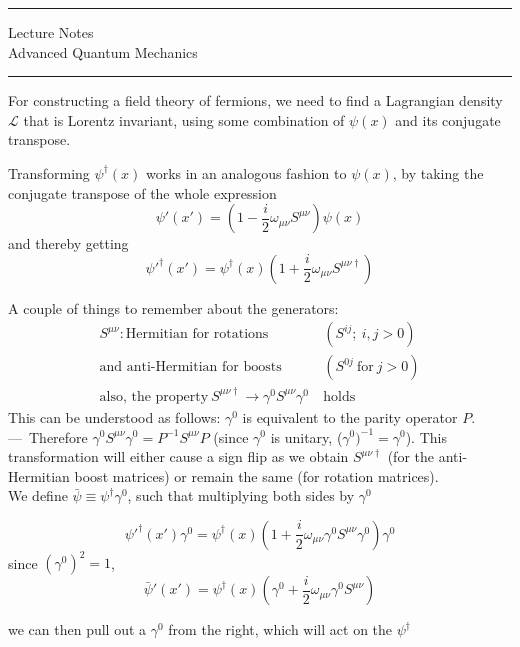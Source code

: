 \documentclass[11pt]{article}
\author{Aayush Arya}
\title{}
\date{January 23, 2023}
\newcommand{\lag}{\mathcal{L}}
\begin{document}
	\maketitle
	
	\hrule
	\begin{center}
		Lecture Notes\\
		Advanced Quantum Mechanics
	\end{center}
	\hrule 
	
	\vspace{11pt}
	For constructing a field theory of fermions, we need to find a Lagrangian density $\lag$ that is Lorentz invariant, using some combination of $\psi(x)$ and its conjugate transpose.
	
	Transforming $\psi^\dagger(x)$ works in an analogous fashion to $\psi(x)$, by taking the conjugate transpose of the whole expression \[ \psi'(x') = \left(1 - \frac{i}{2}\omega_{\mu \nu}S^{\mu\nu}\right) \psi(x)\]
	and thereby getting
	\[ \psi'^\dagger (x') = \psi^\dagger(x)\left(1 + \frac{i}{2} \omega_{\mu\nu}S^{\mu\nu \dagger} \right)\]

	A couple of things to remember about the generators:
	\begin{align*}
		S^{\mu\nu}: \text{Hermitian for rotations}&\ (S^{ij};\ i,j > 0)\\
		 \text{and anti-Hermitian for boosts}&\ (S^{0j}\  \text{for}\ j > 0)\\
		 \text{also, the property}\ S^{\mu\nu\dagger} \rightarrow \gamma^0 S^{\mu\nu} \gamma^0 &\  \text{holds}
	\end{align*}
	This can be understood as follows: $\gamma^0$ is equivalent to the parity operator $P$.\\
	 \----\ Therefore $\gamma^0 S^{\mu\nu} \gamma^0 = P^{-1} S^{\mu\nu} P$ (since $\gamma^0$ is unitary, ($\gamma^0)^{-1} = \gamma^0$). This transformation will either cause a sign flip as we obtain $S^{\mu\nu\dagger}$ (for the anti-Hermitian boost matrices) or remain the same (for rotation matrices).\\
	
	We define $\bar{\psi} \equiv \psi^\dagger \gamma^0$, such that multiplying both sides by $\gamma^0$
	
	\[\psi'^\dagger(x')\gamma^0 = \psi^\dagger(x) \left(1 + \frac{i}{2}\omega_{\mu \nu}\gamma^0 S^{\mu\nu}\gamma^0 \right) \gamma^0\]
	since $(\gamma^0)^2 = 1$,
	\[ \bar{\psi}'(x') = \psi^\dagger (x) \left( \gamma^0 + \frac{i}{2}\omega_{\mu\nu}\gamma^0 S^{\mu\nu}\right)\]
	
	we can then pull out a $\gamma^0$ from the right, which will act on the $\psi^\dagger$
	
\end{document}
